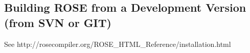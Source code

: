 
\subsection{Building ROSE from a Development Version (from SVN or GIT)}
\label{gettingStarted:UserInstructionsForDevelopmentVersion}

See http://rosecompiler.org/ROSE\_HTML\_Reference/installation.html


